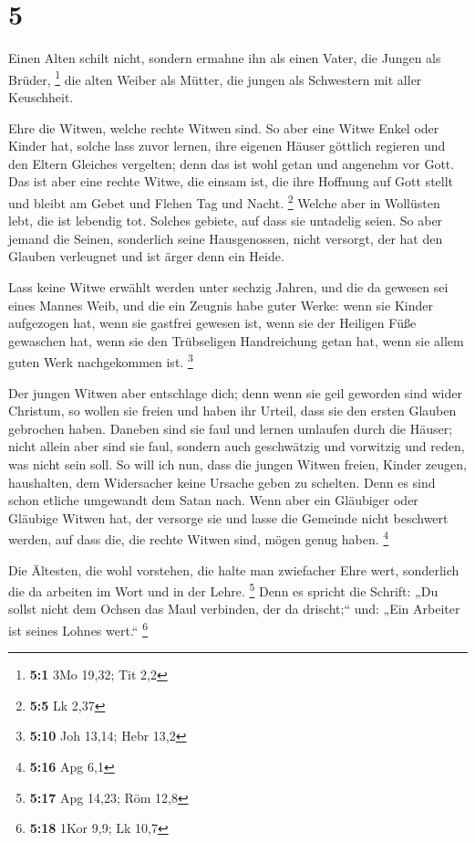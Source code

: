 \hypertarget{section-4}{%
\section{5}\label{section-4}}

 Einen Alten schilt nicht, sondern ermahne ihn als einen
Vater, die Jungen als Brüder, \footnote{\textbf{5:1} 3Mo 19,32; Tit 2,2}
 die alten Weiber als Mütter, die jungen als Schwestern mit
aller Keuschheit.

 Ehre die Witwen, welche rechte Witwen sind.  So
aber eine Witwe Enkel oder Kinder hat, solche lass zuvor lernen, ihre
eigenen Häuser göttlich regieren und den Eltern Gleiches vergelten; denn
das ist wohl getan und angenehm vor Gott.  Das ist aber eine
rechte Witwe, die einsam ist, die ihre Hoffnung auf Gott stellt und
bleibt am Gebet und Flehen Tag und Nacht. \footnote{\textbf{5:5} Lk 2,37}
 Welche aber in Wollüsten lebt, die ist lebendig tot.
 Solches gebiete, auf dass sie untadelig seien. 
So aber jemand die Seinen, sonderlich seine Hausgenossen, nicht
versorgt, der hat den Glauben verleugnet und ist ärger denn ein Heide.

 Lass keine Witwe erwählt werden unter sechzig Jahren, und
die da gewesen sei eines Mannes Weib,  und die ein Zeugnis
habe guter Werke: wenn sie Kinder aufgezogen hat, wenn sie gastfrei
gewesen ist, wenn sie der Heiligen Füße gewaschen hat, wenn sie den
Trübseligen Handreichung getan hat, wenn sie allem guten Werk
nachgekommen ist. \footnote{\textbf{5:10} Joh 13,14; Hebr 13,2}

 Der jungen Witwen aber entschlage dich; denn wenn sie geil
geworden sind wider Christum, so wollen sie freien  und
haben ihr Urteil, dass sie den ersten Glauben gebrochen haben.
 Daneben sind sie faul und lernen umlaufen durch die
Häuser; nicht allein aber sind sie faul, sondern auch geschwätzig und
vorwitzig und reden, was nicht sein soll.  So will ich nun,
dass die jungen Witwen freien, Kinder zeugen, haushalten, dem
Widersacher keine Ursache geben zu schelten.  Denn es sind
schon etliche umgewandt dem Satan nach.  Wenn aber ein
Gläubiger oder Gläubige Witwen hat, der versorge sie und lasse die
Gemeinde nicht beschwert werden, auf dass die, die rechte Witwen sind,
mögen genug haben. \footnote{\textbf{5:16} Apg 6,1}

 Die Ältesten, die wohl vorstehen, die halte man zwiefacher
Ehre wert, sonderlich die da arbeiten im Wort und in der Lehre.
\footnote{\textbf{5:17} Apg 14,23; Röm 12,8}  Denn es
spricht die Schrift: „Du sollst nicht dem Ochsen das Maul verbinden, der
da drischt;`` und: „Ein Arbeiter ist seines Lohnes wert.`` \footnote{\textbf{5:18}
  1Kor 9,9; Lk 10,7}

